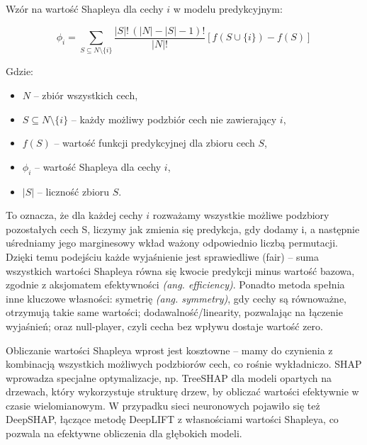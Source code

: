 \documentclass[wmii, inf, mgr]{uwmthesis}
\begin{document}
Wzór na wartość Shapleya dla cechy \( i \) w modelu predykcyjnym:

\[
\phi_i = \sum_{S \subseteq N \setminus \{i\}} \frac{|S|!\,(|N| - |S| - 1)!}{|N|!} \left[ f(S \cup \{i\}) - f(S) \right]
\]

Gdzie:
\begin{itemize}
  \item \( N \) -- zbiór wszystkich cech,
  \item \( S \subseteq N \setminus \{i\} \) --  każdy możliwy podzbiór cech nie zawierający \( i \),
  \item \( f(S) \) -- wartość funkcji predykcyjnej dla zbioru cech \( S \),
  \item \( \phi_i \) -- wartość Shapleya dla cechy \( i \),
  \item \( |S| \) -- liczność zbioru \( S \).
\end{itemize}

To oznacza, że dla każdej cechy \( i \) rozważamy wszystkie możliwe podzbiory pozostałych cech S, liczymy jak zmienia się predykcja, gdy dodamy i, a następnie uśredniamy jego marginesowy wkład ważony odpowiednio liczbą permutacji. Dzięki temu podejściu każde wyjaśnienie jest sprawiedliwe (fair) -- suma wszystkich wartości Shapleya równa się kwocie predykcji minus wartość bazowa, zgodnie z aksjomatem efektywności \textit{(ang. efficiency)}. Ponadto metoda spełnia inne kluczowe własności: symetrię \textit{(ang. symmetry)}, gdy cechy są równoważne, otrzymują takie same wartości; dodawalność/linearity, pozwalając na łączenie wyjaśnień; oraz null‑player, czyli cecha bez wpływu dostaje wartość zero.

Obliczanie wartości Shapleya wprost jest kosztowne -- mamy do czynienia z kombinacją wszystkich możliwych podzbiorów cech, co rośnie wykładniczo. SHAP wprowadza specjalne optymalizacje, np. TreeSHAP dla modeli opartych na drzewach, który wykorzystuje strukturę drzew, by obliczać wartości efektywnie w czasie wielomianowym. W przypadku sieci neuronowych pojawiło się też DeepSHAP, łączące metodę DeepLIFT z własnościami wartości Shapleya, co pozwala na efektywne obliczenia dla głębokich modeli.
\end{document}
